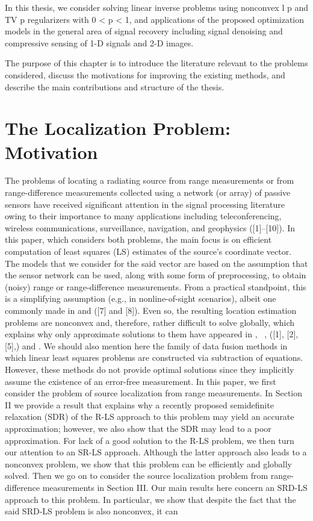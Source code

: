 In this thesis, we consider solving linear inverse problems using nonconvex l p and TV p
regularizers with 0 < p < 1, and applications of the proposed optimization models in
the general area of signal recovery including signal denoising and compressive sensing
of 1-D signals and 2-D images. 

The purpose of this chapter is to introduce the
literature relevant to the problems considered, discuss the motivations for improving
the existing methods, and describe the main contributions and structure of the thesis.

\section{The Localization Problem: Motivation} \label{problem}


The problems of locating a radiating source from range measurements or from range-difference measurements collected using a network (or array) of passive sensors have received significant attention in the signal processing literature owing to their importance to many applications including teleconferencing, wireless communications, surveillance, navigation, and geophysics \cite{SmithAbel, ShcauRob, Yao, Huang, CheungChan, LiHu, Cheung, Sayed, classMDS} ([1]–[10]). In this paper, which considers both problems, the main focus is on efficient computation of least squares (LS) estimates of the source’s coordinate vector. The models that we consider for the said vector are based on  the assumption that the sensor network can be used, along with some form of preprocessing, to obtain (noisy) range or range-difference measurements. From a practical standpoint, this is a simplifying assumption (e.g., in nonline-of-sight scenarios), albeit one commonly made in \cite{Cheung} and \cite{classMDS} ([7] and [8]). Even so, the resulting location estimation problems are nonconvex and, therefore, rather difficult to solve globally, which explains why only approximate solutions to them have appeared in \cite{SmithAbel}, ~, \cite{LiHu} ([1], [2], [5],) and \cite{Cheung}. We should also mention here the family of data fusion methods \cite{Sayed} in which linear least squares problems are constructed via subtraction of equations. However, these methods do not provide optimal solutions since they implicitly assume the existence of an error-free measurement. In this paper, we first consider the problem of source localization from range measurements. In Section II we provide a result that explains why a recently proposed semidefinite relaxation (SDR) \cite{Cheung} of the R-LS approach to this problem may yield an accurate approximation; however, we also show that the SDR may lead to a poor approximation. For lack of a good solution to the R-LS problem, we then turn our attention to an SR-LS approach. Although the latter approach also leads to a nonconvex problem, we show that this problem can be efficiently and globally solved. Then we go on to consider the source localization problem from range-difference measurements in Section III. Our main results here concern an SRD-LS approach to this problem. In particular, we show that despite the fact that the said SRD-LS problem is also nonconvex, it can 